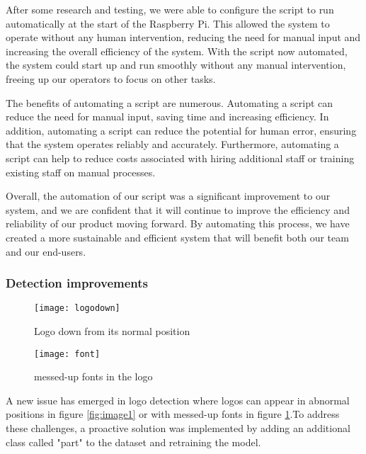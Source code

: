 After some research and testing, we were able to configure the script to run automatically at the start of the Raspberry Pi. This allowed the system to operate without any human intervention, reducing the need for manual input and increasing the overall efficiency of the system. With the script now automated, the system could start up and run smoothly without any manual intervention, freeing up our operators to focus on other tasks.

The benefits of automating a script are numerous. Automating a script can reduce the need for manual input, saving time and increasing efficiency. In addition, automating a script can reduce the potential for human error, ensuring that the system operates reliably and accurately. Furthermore, automating a script can help to reduce costs associated with hiring additional staff or training existing staff on manual processes.

Overall, the automation of our script was a significant improvement to our system, and we are confident that it will continue to improve the efficiency and reliability of our product moving forward. By automating this process, we have created a more sustainable and efficient system that will benefit both our team and our end-users.
\subsubsection{Detection improvements}

\FloatBarrier

\begin{figure}[htbp]
    \centering
    
    \begin{minipage}{0.4\textwidth}
        \centering
        \texttt{[image: logodown]}
        \caption{Logo down from its normal position}
        \label{fig:image1}
    \end{minipage}
    \hfill
    \begin{minipage}{0.4\textwidth}
        \centering
        \texttt{[image: font]}
        \caption{messed-up fonts in the logo}
        \label{fig:image2}
    \end{minipage}
        
\end{figure}
\FloatBarrier
A new issue has emerged in logo detection where logos can appear in abnormal positions in figure \ref{fig:image1} or with messed-up fonts  in figure \ref{fig:image2}.To address these challenges, a proactive solution was implemented by adding an additional class called "part" to the dataset and retraining the model.
\FloatBarrier

